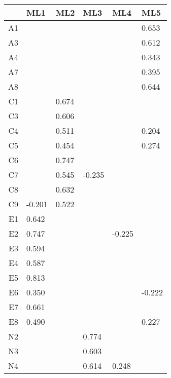 \begin{table}[ht]
\centering
\begin{tabular}{rlllll}
  \toprule
 & {\textbf{ML1}} & {\textbf{ML2}} & {\textbf{ML3}} & {\textbf{ML4}} & {\textbf{ML5}} \\ 
  \midrule
A1 &        &        &        &        &  0.653 \\ 
  A3 &        &        &        &        &  0.612 \\ 
  A4 &        &        &        &        &  0.343 \\ 
  A7 &        &        &        &        &  0.395 \\ 
  A8 &        &        &        &        &  0.644 \\ 
  C1 &        &  0.674 &        &        &        \\ 
  C3 &        &  0.606 &        &        &        \\ 
  C4 &        &  0.511 &        &        &  0.204 \\ 
  C5 &        &  0.454 &        &        &  0.274 \\ 
  C6 &        &  0.747 &        &        &        \\ 
  C7 &        &  0.545 & -0.235 &        &        \\ 
  C8 &        &  0.632 &        &        &        \\ 
  C9 & -0.201 &  0.522 &        &        &        \\ 
  E1 &  0.642 &        &        &        &        \\ 
  E2 &  0.747 &        &        & -0.225 &        \\ 
  E3 &  0.594 &        &        &        &        \\ 
  E4 &  0.587 &        &        &        &        \\ 
  E5 &  0.813 &        &        &        &        \\ 
  E6 &  0.350 &        &        &        & -0.222 \\ 
  E7 &  0.661 &        &        &        &        \\ 
  E8 &  0.490 &        &        &        &  0.227 \\ 
  N2 &        &        &  0.774 &        &        \\ 
  N3 &        &        &  0.603 &        &        \\ 
  N4 &        &        &  0.614 &  0.248 &        \\ 

\end{tabular}
\end{table}
